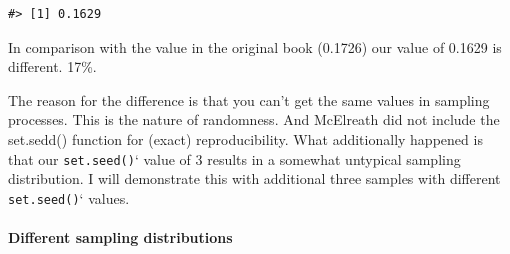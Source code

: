 \documentclass[
  letterpaper,
  DIV=11,
  numbers=noendperiod]{scrreprt}
\let\oldparagraph\paragraph
\renewcommand{\paragraph}[1]{\oldparagraph{#1}\mbox{}}
\begin{document}
\begin{verbatim}
#> [1] 0.1629
\end{verbatim}

\begin{tcolorbox}[enhanced jigsaw, colframe=quarto-callout-caution-color-frame, colback=white, toprule=.15mm, breakable, arc=.35mm, bottomtitle=1mm, colbacktitle=quarto-callout-caution-color!10!white, toptitle=1mm, titlerule=0mm, title=\textcolor{quarto-callout-caution-color}{\faFire}\hspace{0.5em}{Attention: Different values}, leftrule=.75mm, opacityback=0, rightrule=.15mm, opacitybacktitle=0.6, bottomrule=.15mm, left=2mm, coltitle=black]

In comparison with the value in the original book (0.1726) our value of
0.1629 is different. 17\%.

The reason for the difference is that you can't get the same values in
sampling processes. This is the nature of randomness. And McElreath did
not include the set.sedd() function for (exact) reproducibility. What
additionally happened is that our \texttt{set.seed()}` value of 3
results in a somewhat untypical sampling distribution. I will
demonstrate this with additional three samples with different
\texttt{set.seed()}` values.

\end{tcolorbox}

\hypertarget{different-sampling-distributions}{%
\paragraph{Different sampling
distributions}\label{different-sampling-distributions}}
\end{document}
